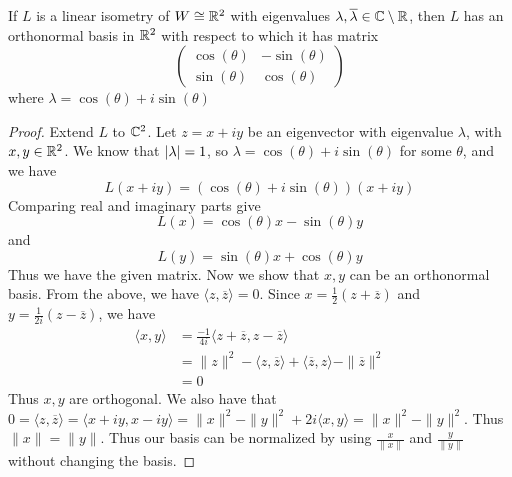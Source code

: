 \documentclass[a4paper]{article}
\begin{document}
\begin{lmm}{}{} If $L$ is a linear isometry of $W\cong\mathbb{R}^2$ with eigenvalues $\lambda,\overline{\lambda}\in\mathbb{C}\setminus\mathbb{R}$, then $L$ has an orthonormal basis in $\mathbb{R}^2$ with respect to which it has matrix $$\begin{pmatrix}\cos(\theta) & -\sin(\theta)\\ \sin(\theta) & \cos(\theta)\end{pmatrix}$$ where $\lambda=\cos(\theta)+i\sin(\theta)$\tcbline
\begin{proof} Extend $L$ to $\mathbb{C}^2$. Let $z=x+iy$ be an eigenvector with eigenvalue $\lambda$, with $x,y\in\mathbb{R}^2$. We know that $\abs{\lambda}=1$, so $\lambda=\cos(\theta)+i\sin(\theta)$ for some $\theta$, and we have $$L(x+iy)=(\cos(\theta)+i\sin(\theta))(x+iy)$$ Comparing real and imaginary parts give $$L(x)=\cos(\theta)x-\sin(\theta)y$$ and $$L(y)=\sin(\theta)x+\cos(\theta)y$$ Thus we have the given matrix. \linebreak\linebreak
Now we show that $x,y$ can be an orthonormal basis. From the above, we have $\langle z,\overline{z}\rangle=0$. Since $x=\frac{1}{2}(z+\overline{z})$ and $y=\frac{1}{2i}(z-\overline{z})$, we have
\begin{align*}
\langle x,y\rangle&=\frac{-1}{4i}\langle z+\overline{z},z-\overline{z}\rangle\\
&=\|z\|^2-\langle z,\overline{z}\rangle+\langle\overline{z},z\rangle-\|\overline{z}\|^2\\
&=0
\end{align*}
Thus $x,y$ are orthogonal. We also have that $0=\langle z,\overline{z}\rangle=\langle x+iy,x-iy\rangle=\|x\|^2-\|y\|^2+2i\langle x,y\rangle=\|x\|^2-\|y\|^2$. Thus $\|x\|=\|y\|$. Thus our basis can be normalized by using $\frac{x}{\|x\|}$ and $\frac{y}{\|y\|}$ without changing the basis. 
\end{proof}
\end{lmm}
\end{document}
